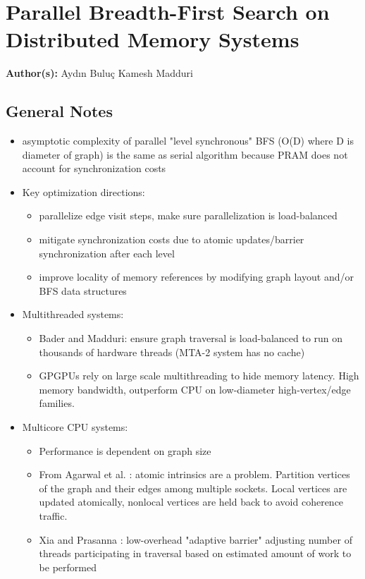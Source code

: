 \section{Parallel Breadth-First Search on Distributed Memory Systems}

\textbf{Author(s):} Aydın Buluç Kamesh Madduri

\subsection{General Notes}

\begin{itemize}
    \item asymptotic complexity of parallel "level synchronous" BFS (O(D) where D is diameter of graph) is the same as serial algorithm because PRAM does not account for synchronization costs
    \item Key optimization directions:
    \begin{itemize}
        \item parallelize edge visit steps, make sure parallelization is load-balanced
        \item mitigate synchronization costs due to atomic updates/barrier synchronization after each level
        \item improve locality of memory references by modifying graph layout and/or BFS data structures
    \end{itemize}
    \item Multithreaded systems:
    \begin{itemize}
        \item Bader and Madduri: ensure graph traversal is load-balanced to run on thousands of hardware threads (MTA-2 system has no cache)
        \item GPGPUs rely on large scale multithreading to hide memory latency. High memory bandwidth, outperform CPU on low-diameter high-vertex/edge families. 
    \end{itemize}
    \item Multicore CPU systems:
    \begin{itemize}
        \item Performance is dependent on graph size
        \item From Agarwal et al. : atomic intrinsics are a problem. Partition vertices of the graph and their edges among multiple sockets. Local vertices are updated atomically, nonlocal vertices are held back to avoid coherence traffic.
        \item Xia and Prasanna : low-overhead "adaptive barrier" adjusting number of threads participating in traversal based on estimated amount of work to be performed

\end{itemize}
\end{itemize}
